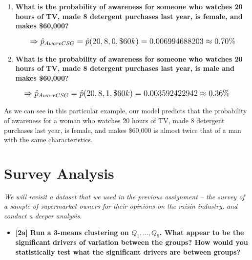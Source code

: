 \documentclass[10pt, oneside,spanish]{article}
\begin{document}
\begin{enumerate}
\item \textbf{What is the probability of awareness for someone who watches 20 hours of TV, made 8 detergent purchases last year, is female, and makes \$60,000? }

$$  \mathlarger{ \Rightarrow \hat{p}_{AwareCSG} = \hat{p}(20,8,0,\$60k) = 0.006994688203 \approx 0.70\% }$$


\item \textbf{What is the probability of awareness for someone who watches 20 hours of TV, made 8 detergent purchases last year, is male and makes \$60,000? }
\end{enumerate}

$$  \mathlarger{ \Rightarrow \hat{p}_{AwareCSG} = \hat{p}(20,8,1,\$60k) = 0.003592422942 \approx  0.36\% }$$

As we can see in this particular example, our model predicts that the probability of awareness for a woman who watches 20 hours of TV, made 8 detergent purchases last year, is female, and makes \$60,000 is almost twice that of a man with the same characteristics. 

\pagebreak

\section{Survey Analysis}

\textit{We will revisit a dataset that we used in the previous assignment – the survey of a sample of supermarket owners for their opinions on the raisin industry, and conduct a deeper analysis.}

\begin{itemize}
\item \textbf{[2a] Run a 3-means clustering on $ Q_{1},...,Q_{9} $. What appear to be the significant drivers of variation between the groups? How would you statistically test what the significant drivers are between groups?   }
\end{itemize}
\end{document}
